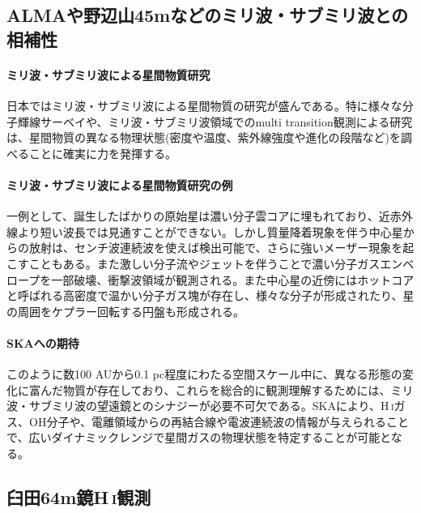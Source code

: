 \subsection{ALMAや野辺山45mなどのミリ波・サブミリ波との相補性}
\label{c08.s4.ss2}

\paragraph{ミリ波・サブミリ波による星間物質研究}

日本ではミリ波・サブミリ波による星間物質の研究が盛んである。特に様々な分子輝線サーベイや、ミリ波・サブミリ波領域でのmulti transition観測による研究は、星間物質の異なる物理状態(密度や温度、紫外線強度や進化の段階など)を調べることに確実に力を発揮する。

\paragraph{ミリ波・サブミリ波による星間物質研究の例}

一例として、誕生したばかりの原始星は濃い分子雲コアに埋もれており、近赤外線より短い波長では見通すことができない。しかし質量降着現象を伴う中心星からの放射は、センチ波連続波を使えば検出可能で、さらに強いメーザー現象を起こすこともある。また激しい分子流やジェットを伴うことで濃い分子ガスエンベロープを一部破壊、衝撃波領域が観測される。また中心星の近傍にはホットコアと呼ばれる高密度で温かい分子ガス塊が存在し、様々な分子が形成されたり、星の周囲をケプラー回転する円盤も形成される。

\paragraph{SKAへの期待}

このように数100 AUから0.1 pc程度にわたる空間スケール中に、異なる形態の変化に富んだ物質が存在しており、これらを総合的に観測理解するためには、ミリ波・サブミリ波の望遠鏡とのシナジーが必要不可欠である。SKAにより、H\,\textsc{i}ガス、OH分子や、電離領域からの再結合線や電波連続波の情報が与えられることで、広いダイナミックレンジで星間ガスの物理状態を特定することが可能となる。


\subsection{臼田64m鏡H\,\textsc{i}観測}
\label{c08.s4.ss3}

